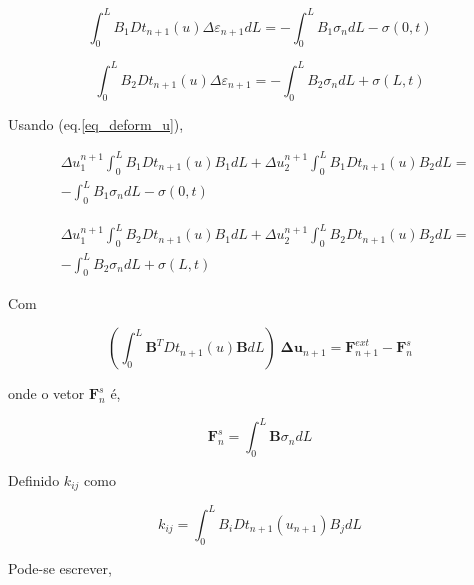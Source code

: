 \documentclass[12pt,a4paper]{article}
\newcommand{\diff}[1]{d#1}
\begin{document}
\begin{equation}
\int_0^L B_1 Dt_{n+1}\left(u\right) \Delta\varepsilon_{n+1} \diff{L}= -\int_0^L B_1 \sigma_{n} \diff{L} - \sigma\left(0,t\right)
\end{equation}


\begin{equation}
\int_0^L B_2 Dt_{n+1}\left(u\right) \Delta\varepsilon_{n+1}  = -\int_0^L B_2 \sigma_{n}\diff{L} + \sigma\left(L,t\right)
\end{equation}


\noindent
Usando (eq.\ref{eq_deform_u}),

\begin{equation}
\begin{split}
&\Delta u_1^{n+1} \int_0^L B_1 Dt_{n+1}\left(u\right) B_1 \diff{L} + \Delta u_2^{n+1} \int_0^L B_1 Dt_{n+1}\left(u\right) B_2 \diff{L} =\\
&-\int_0^L B_1 \sigma_{n}\diff{L} - \sigma\left(0,t\right)
\end{split}
\end{equation}

\begin{equation}
\begin{split}
&\Delta u_1^{n+1} \int_0^L B_2 Dt_{n+1}\left(u\right) B_1 \diff{L} + \Delta u_2^{n+1} \int_0^L B_2 Dt_{n+1}\left(u\right) B_2 \diff{L} =\\
&-\int_0^L B_2 \sigma_{n}\diff{L} + \sigma\left(L,t\right)
\end{split}
\end{equation}

Com 

\begin{equation}
\left(\int_0^L \mathbf{B}^T Dt_{n+1}\left(u\right) \mathbf{B} \diff{L}\right) \; \mathbf{\Delta u}_{n+1} = \mathbf{F}^{ext}_{n+1} - \mathbf{F}^s_n
\end{equation}

onde o vetor $\mathbf{F}^s_n$ é,

\begin{equation}
\mathbf{F}^s_n = \int_0^L \mathbf{B} \sigma_{n}\diff{L}
\end{equation}


Definido $k_{ij}$ como

\begin{equation}
k_{ij} = \int_0^L B_i Dt_{n+1}\left(u_{n+1}\right) B_j \diff{L}
\end{equation}

Pode-se escrever,
\end{document}
